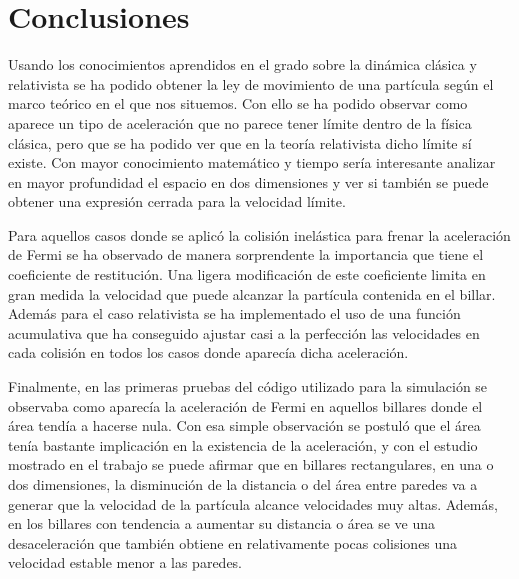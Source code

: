 %
%

\chapter{Conclusiones}

Usando los conocimientos aprendidos en el grado sobre la dinámica clásica y relativista se ha podido obtener la ley de movimiento de una partícula según el marco teórico en el que nos situemos. Con ello se ha podido observar como aparece un tipo de aceleración que no parece tener límite dentro de la física clásica, pero que se ha podido ver que en la teoría relativista dicho límite sí existe. Con mayor conocimiento matemático y tiempo sería interesante analizar en mayor profundidad el espacio en dos dimensiones y ver si también se puede obtener una expresión cerrada para la velocidad límite. 

\vspace{3mm}

Para aquellos casos donde se aplicó la colisión inelástica para frenar la aceleración de Fermi se ha observado de manera sorprendente la importancia que tiene el coeficiente de restitución. Una ligera modificación de este coeficiente limita en gran medida la velocidad que puede alcanzar la partícula contenida en el billar. Además para el caso relativista se ha implementado el uso de una función acumulativa que ha conseguido ajustar casi a la perfección las velocidades en cada colisión en todos los casos donde aparecía dicha aceleración.

\vspace{3mm}

Finalmente, en las primeras pruebas del código utilizado para la simulación se observaba como aparecía la aceleración de Fermi en aquellos billares donde el área tendía a hacerse nula. Con esa simple observación se postuló que el área tenía bastante implicación en la existencia de la aceleración, y con el estudio mostrado en el trabajo se puede afirmar que en billares rectangulares, en una o dos dimensiones, la disminución de la distancia o del área entre paredes va a generar que la velocidad de la partícula alcance velocidades muy altas. Además, en los billares con tendencia a aumentar su distancia o área se ve una desaceleración que también obtiene en relativamente pocas colisiones una velocidad estable menor a las paredes. 

%